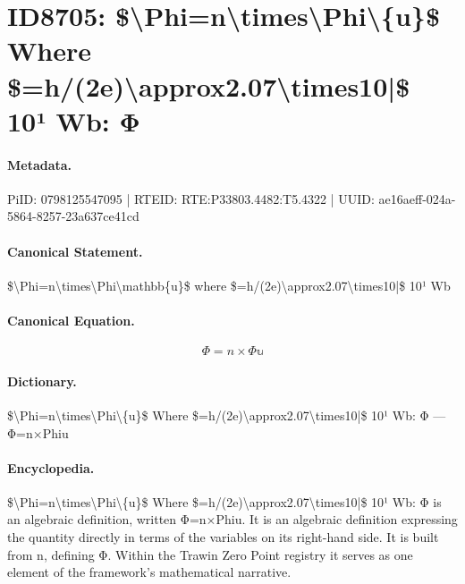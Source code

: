 \section*{ID8705: \$\textbackslash{}Phi=n\textbackslash{}times\textbackslash{}Phi\textbackslash{}\{u\}\$ Where \$=h/(2e)\textbackslash{}approx2.07\textbackslash{}times10|\$ 10¹ Wb: Φ}
\paragraph{Metadata.}
PiID: 0798125547095 | RTEID: RTE:P33803.4482:T5.4322 | UUID: ae16aeff-024a-5864-8257-23a637ce41cd

\paragraph{Canonical Statement.}
\$\textbackslash{}Phi=n\textbackslash{}times\textbackslash{}Phi\textbackslash{}mathbb\{u\}\$ where \$=h/(2e)\textbackslash{}approx2.07\textbackslash{}times10|\$ 10¹ Wb

\paragraph{Canonical Equation.}
\[
\Phi=n\times\Phi\mathbb{u}
\]

\paragraph{Dictionary.}
\$\textbackslash{}Phi=n\textbackslash{}times\textbackslash{}Phi\textbackslash{}\{u\}\$ Where \$=h/(2e)\textbackslash{}approx2.07\textbackslash{}times10|\$ 10¹ Wb: Φ — Φ=n×Phiu

\paragraph{Encyclopedia.}
\$\textbackslash{}Phi=n\textbackslash{}times\textbackslash{}Phi\textbackslash{}\{u\}\$ Where \$=h/(2e)\textbackslash{}approx2.07\textbackslash{}times10|\$ 10¹ Wb: Φ is an algebraic definition, written Φ=n×Phiu. It is an algebraic definition expressing the quantity directly in terms of the variables on its right-hand side. It is built from n, defining Φ. Within the Trawin Zero Point registry it serves as one element of the framework's mathematical narrative.
